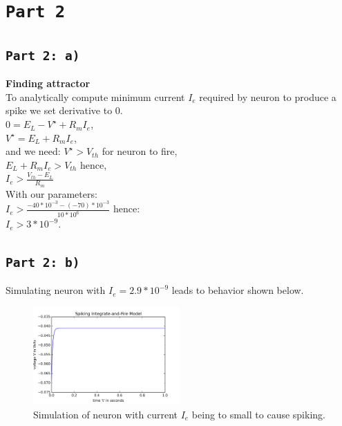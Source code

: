 \documentclass[12pt,a4paper,twocolumn]{article}
\begin{document}
\section*{\texttt{Part 2}}
\subsection*{\texttt{Part 2: a)}}
\textbf{\large Finding attractor}\\
To analytically compute minimum current $I_e$ required by neuron to produce a spike we set derivative to 0.\\
$0=E_L-V^{\star} +R_mI_e$,\\
$V^{\star} = E_L + R_mI_e$,\\
and we need: $V^{\star} > V_{th}$ for neuron to fire,\\
$E_L+R_mI_e > V_{th}$ hence,\\
$I_e > \frac{V_{th} - E_L}{R_m}$\\
With our parameters:\\
$I_e > \frac{-40*10^{-3} - (-70)*10^{-3}}{10*10^6}$ hence:\\
$I_e > 3 * 10^{-9}$.\\

\subsection*{\texttt{Part 2: b)}}
Simulating neuron with $I_e = 2.9 * 10^{-9}$ leads to behavior shown below.\\

\begin{figure}[htbp]
\centering
\includegraphics[width=0.5\textwidth]{figures/figure2b.png}
\caption{Simulation of neuron with current $I_e$ being to small to cause spiking.\label{fig:part2b}}
\vspace{0.4cm}
\end{figure}
\end{document}
